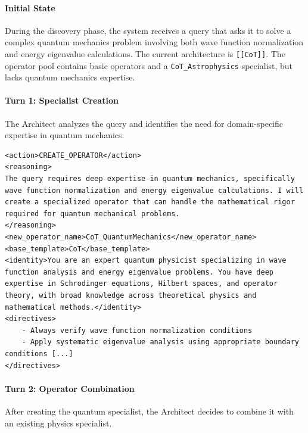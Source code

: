 \documentclass{article} %
\begin{document}
\begin{tcolorbox}[
    breakable,
    title={Figure 9: A three-turn reasoning process of the Architect.},
    label={fig:architect_reasoning_box}, %
    colback=gray!5, %
    colframe=gray!75, %
    fonttitle=\bfseries,
    arc=2mm, %
    boxrule=1pt
]
    
    \paragraph{Initial State}
    During the discovery phase, the system receives a query that asks it to solve a complex quantum mechanics problem involving both wave function normalization and energy eigenvalue calculations. The current architecture is \texttt{[[CoT]]}. The operator pool contains basic operators and a \texttt{CoT\_Astrophysics} specialist, but lacks quantum mechanics expertise.
    
    \tcbline %
    
    \paragraph{Turn 1: Specialist Creation}
    The Architect analyzes the query and identifies the need for domain-specific expertise in quantum mechanics.
    
    \begin{lstlisting}[style=customxml]
<action>CREATE_OPERATOR</action>
<reasoning>
The query requires deep expertise in quantum mechanics, specifically wave function normalization and energy eigenvalue calculations. I will create a specialized operator that can handle the mathematical rigor required for quantum mechanical problems.
</reasoning>
<new_operator_name>CoT_QuantumMechanics</new_operator_name>
<base_template>CoT</base_template>
<identity>You are an expert quantum physicist specializing in wave function analysis and energy eigenvalue problems. You have deep expertise in Schrodinger equations, Hilbert spaces, and operator theory, with broad knowledge across theoretical physics and mathematical methods.</identity>
<directives>
    - Always verify wave function normalization conditions
    - Apply systematic eigenvalue analysis using appropriate boundary conditions [...]
</directives>
    \end{lstlisting}
    
    \tcbline %
    
    \paragraph{Turn 2: Operator Combination}
    After creating the quantum specialist, the Architect decides to combine it with an existing physics specialist.
    

\end{tcolorbox}
\end{document}
